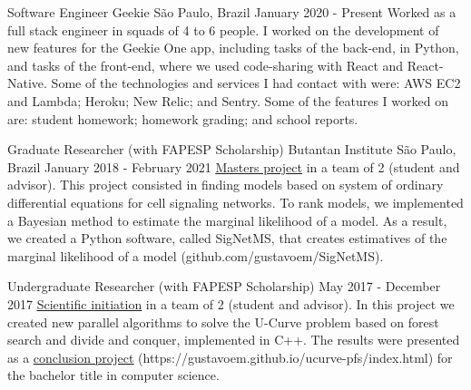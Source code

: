 \documentclass[11pt, a4paper]{awesome-cv-res}
\begin{document}
\begin{cventries}
\cventry
{Software Engineer}
{Geekie}
{São Paulo, Brazil}
{January 2020 - Present}
{Worked as a full stack engineer in squads of 4 to 6 people. I worked on
the development of new features for the Geekie One app, including tasks 
of the back-end, in Python, and tasks of the front-end, where we used 
code-sharing with React and React-Native. Some of the technologies and
services I had contact with were: AWS EC2 and Lambda; Heroku; New Relic;
and Sentry.
Some of the features I worked on are: student homework; 
homework grading; and school reports.
}

\cventry
{Graduate Researcher (with FAPESP Scholarship)}
{Butantan Institute}
{São Paulo, Brazil}
{January 2018 - February 2021}
{\href{https://bv.fapesp.br/en/bolsas/175684/identification-of-cell-signaling-pathways-based-on-biochemical-reaction-kinetics-repositories/}
{\color{awesome}\underline {Masters project}} in a team of 2 (student 
    and advisor). This project consisted in finding models based on
    system of ordinary differential equations for cell signaling
    networks. To rank models, we implemented a Bayesian method to
    estimate the marginal likelihood of a model. As a result, we created
    a Python software, called SigNetMS, that creates estimatives of
    the marginal likelihood of a model (github.com/gustavoem/SigNetMS).
}

\cventry
{Undergraduate Researcher (with FAPESP Scholarship)}
{}
{}
{May 2017 - December 2017}
{\href{https://bv.fapesp.br/en/bolsas/170553/design-of-poset-forest-based-algorithms-for-the-u-curve-optimization-problem/}
{\color{awesome} \underline{Scientific initiation}} in a team of 2 
    (student and advisor). In this project we created new parallel 
    algorithms to solve the U-Curve problem based on forest search and 
    divide and conquer, implemented in C++. The results were presented 
    as a \href{https://gustavoem.github.io/ucurve-pfs/index.html}
    {\color{awesome} \underline{conclusion
    project}} (https://gustavoem.github.io/ucurve-pfs/index.html) for 
    the bachelor title in computer science.}


\end{cventries}
\end{document}
